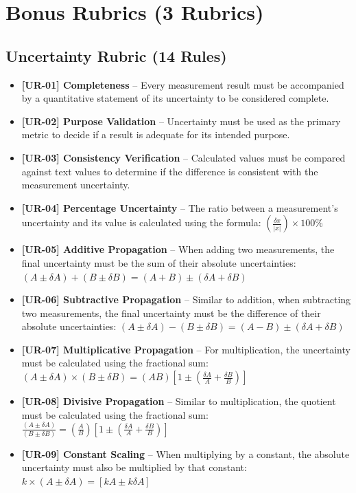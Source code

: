 \documentclass{article}
\begin{document}
\section*{Bonus Rubrics (3 Rubrics)}

\subsection*{Uncertainty Rubric (14 Rules)}
\begin{itemize}
\item \textbf{ [UR-01] Completeness } – Every measurement result must be accompanied by a quantitative statement of its uncertainty to be considered complete.
\item \textbf{ [UR-02] Purpose Validation } – Uncertainty must be used as the primary metric to decide if a result is adequate for its intended purpose.
\item \textbf{ [UR-03] Consistency Verification } – Calculated values must be compared against text values to determine if the difference is consistent with the measurement uncertainty.
\item \textbf{ [UR-04] Percentage Uncertainty } – The ratio between a measurement's uncertainty and its value is calculated using the formula: $( \frac{\delta x}{|x|} ) \times 100\%$
\item \textbf{ [UR-05] Additive Propagation } – When adding two measurements, the final uncertainty must be the sum of their absolute uncertainties: $ (A \pm \delta A) + (B \pm \delta B) = (A + B) \pm (\delta A + \delta B) $
\item \textbf{ [UR-06] Subtractive Propagation } – Similar to addition, when subtracting two measurements, the final uncertainty must be the difference of their absolute uncertainties: $ (A \pm \delta A) - (B \pm \delta B) = (A - B) \pm (\delta A + \delta B) $
\item \textbf{ [UR-07] Multiplicative Propagation } – For multiplication, the uncertainty must be calculated using the fractional sum: $ (A \pm \delta A) \times (B \pm \delta B) = (AB) \left[ 1 \pm \left( \frac{\delta A}{A} + \frac{\delta B}{B} \right) \right] $
\item \textbf{ [UR-08] Divisive Propagation } – Similar to multiplication,  the quotient must be calculated using the fractional sum: $ \frac{(A \pm \delta A)}{(B \pm \delta B)} = \left( \frac{A}{B} \right) \left[ 1 \pm \left( \frac{\delta A}{A} + \frac{\delta B}{B} \right) \right] $
\item \textbf{ [UR-09] Constant Scaling } – When multiplying by a constant, the absolute uncertainty must also be multiplied by that constant: $ k \times (A \pm \delta A) = [kA \pm k\delta A] $

\end{itemize}
\end{document}
